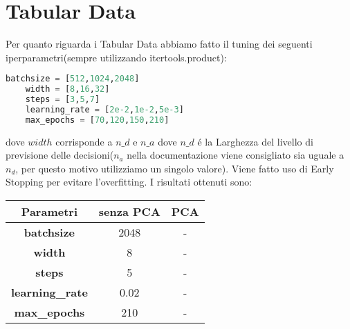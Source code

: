 \documentclass[../../Report.tex]{subfiles}
\begin{document}
\section{Tabular Data}
Per quanto riguarda i Tabular Data abbiamo fatto il tuning dei seguenti iperparametri(sempre utilizzando itertools.product):
\begin{lstlisting}[language=Python]
    batchsize = [512,1024,2048]
    width = [8,16,32]
    steps = [3,5,7]
    learning_rate = [2e-2,1e-2,5e-3]    
    max_epochs = [70,120,150,210]
\end{lstlisting}
dove $width$ corrisponde a $n\_d$ e $n\_a$ dove $n\_d$ é la Larghezza del livello di previsione delle decisioni($n_a$ nella documentazione viene consigliato sia uguale a $n_d$, per questo motivo utilizziamo un singolo valore).
Viene fatto uso di Early Stopping per evitare l'overfitting.
I risultati ottenuti sono:
\begin{table}[h]
    \centering
    \begin{tabular}{|c|c|c|}
    \hline
\textbf{Parametri} & \textbf{senza PCA} & \textbf{PCA} \\ \hline
\textbf{batchsize}& 2048 & -\\
\textbf{width}& 8 &  - \\
\textbf{steps}& 5 & -\\
\textbf{learning\_rate}& 0.02 &  -\\
\textbf{max\_epochs}& 210 & -\\
\hline
\end{tabular}
\end{table}
\end{document}
